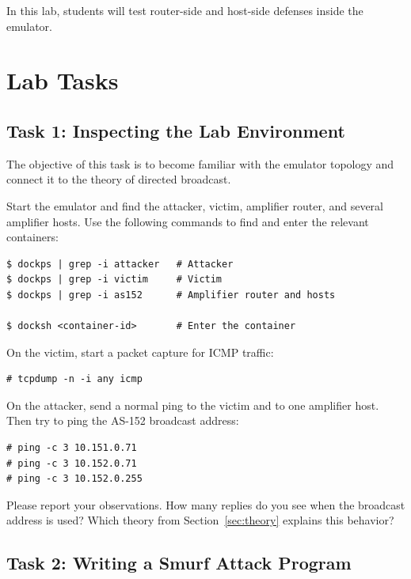 In this lab, students will test router-side and host-side defenses inside the
emulator.


\section{Lab Tasks}


\subsection{Task 1: Inspecting the Lab Environment}

The objective of this task is to become familiar with the emulator topology and
connect it to the theory of directed broadcast. 

Start the emulator and find the attacker, victim, amplifier router, and several
amplifier hosts. Use the following commands to find and enter the relevant containers:

\begin{lstlisting}
$ dockps | grep -i attacker   # Attacker
$ dockps | grep -i victim     # Victim
$ dockps | grep -i as152      # Amplifier router and hosts

$ docksh <container-id>       # Enter the container
\end{lstlisting}

On the victim, start a packet capture for ICMP traffic:

\begin{lstlisting}
# tcpdump -n -i any icmp
\end{lstlisting}

On the attacker, send a normal ping to the victim and to one amplifier host.
Then try to ping the AS-152 broadcast address:

\begin{lstlisting}
# ping -c 3 10.151.0.71
# ping -c 3 10.152.0.71
# ping -c 3 10.152.0.255
\end{lstlisting}

Please report your observations. How many replies do you see when the
broadcast address is used? Which theory from Section~\ref{sec:theory}
explains this behavior?


\subsection{Task 2: Writing a Smurf Attack Program}

